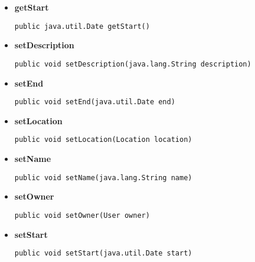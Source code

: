 \documentclass[11pt,a4paper]{report}
\begin{document}
{{{{{{{{{{{\begin{itemize}
{
\hypertarget{edu.kit.pse17.go_app.GO.getOwner()}{{\bf  getOwner}\\}
\begin{lstlisting}[frame=none]
public User getOwner()\end{lstlisting} %
}%
\item{ 
\hypertarget{edu.kit.pse17.go_app.GO.getStart()}{{\bf  getStart}\\}
\begin{lstlisting}[frame=none]
public java.util.Date getStart()\end{lstlisting} %
}%
\item{ 
\hypertarget{edu.kit.pse17.go_app.GO.setDescription(java.lang.String)}{{\bf  setDescription}\\}
\begin{lstlisting}[frame=none]
public void setDescription(java.lang.String description)\end{lstlisting} %
}%
\item{ 
\hypertarget{edu.kit.pse17.go_app.GO.setEnd(java.util.Date)}{{\bf  setEnd}\\}
\begin{lstlisting}[frame=none]
public void setEnd(java.util.Date end)\end{lstlisting} %
}%
\item{ 
\hypertarget{edu.kit.pse17.go_app.GO.setLocation(Location)}{{\bf  setLocation}\\}
\begin{lstlisting}[frame=none]
public void setLocation(Location location)\end{lstlisting} %
}%
\item{ 
\hypertarget{edu.kit.pse17.go_app.GO.setName(java.lang.String)}{{\bf  setName}\\}
\begin{lstlisting}[frame=none]
public void setName(java.lang.String name)\end{lstlisting} %
}%
\item{ 
\hypertarget{edu.kit.pse17.go_app.GO.setOwner(edu.kit.pse17.go_app.User)}{{\bf  setOwner}\\}
\begin{lstlisting}[frame=none]
public void setOwner(User owner)\end{lstlisting} %
}%
\item{ 
\hypertarget{edu.kit.pse17.go_app.GO.setStart(java.util.Date)}{{\bf  setStart}\\}
\begin{lstlisting}[frame=none]
public void setStart(java.util.Date start)\end{lstlisting} %
}%
\end{itemize}
}
}
}}}}}}}}}
\end{document}

